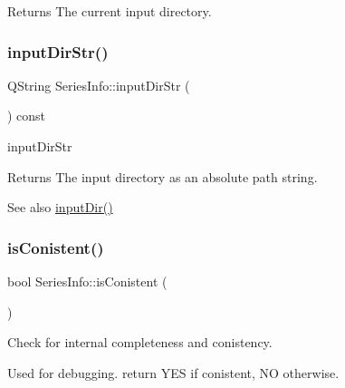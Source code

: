\begin{DoxyReturn}{Returns}
The current input directory. 
\end{DoxyReturn}
\mbox{\label{class_series_info_a550fbfcf3061fdd50850baa788bf376d}} 
\subsubsection{\texorpdfstring{input\+Dir\+Str()}{inputDirStr()}}
{\footnotesize\ttfamily Q\+String Series\+Info\+::input\+Dir\+Str (\begin{DoxyParamCaption}{ }\end{DoxyParamCaption}) const\hspace{0.3cm}{\ttfamily [inline]}}



input\+Dir\+Str 

\begin{DoxyReturn}{Returns}
The input directory as an absolute path string. 
\end{DoxyReturn}
\begin{DoxySeeAlso}{See also}
\hyperlink{class_series_info_ab30b8c01a3413b913f00203b2ef5a117}{input\+Dir()} 
\end{DoxySeeAlso}
\mbox{\label{class_series_info_a3765099ab2658fa04ea0863f0b1e4b2b}} 
\subsubsection{\texorpdfstring{is\+Conistent()}{isConistent()}}
{\footnotesize\ttfamily bool Series\+Info\+::is\+Conistent (\begin{DoxyParamCaption}{ }\end{DoxyParamCaption})}



Check for internal completeness and conistency. 

Used for debugging. return Y\+ES if conistent, NO otherwise. \mbox{\label{class_series_info_a3855143383f2a9c6c66a05946e51d1f6}} 
